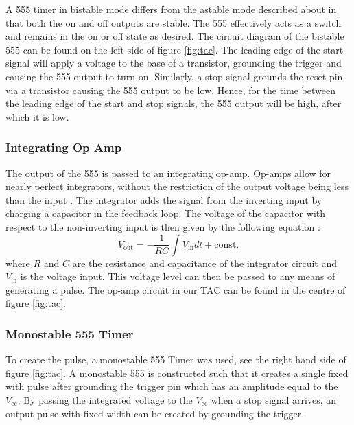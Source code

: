 \documentclass[%
 reprint,
 amsmath,amssymb,
 aps,
]{revtex4-2}
\begin{document}
        A 555 timer in bistable mode differs from the astable mode described about in that both the on and off outputs are stable. The 555 effectively acts as a switch and remains in the on or off state as desired. The circuit diagram of the bistable 555 can be found on the left side of figure \ref{fig:tac}. The leading edge of the start signal will apply a voltage to the base of a transistor, grounding the trigger and causing the 555 output to turn on. Similarly, a stop signal grounds the reset pin via a transistor causing the 555 output to be low. Hence, for the time between the leading edge of the start and stop signals, the 555 output will be high, after which it is low.

        \subsubsection{Integrating Op Amp}
        The output of the 555 is passed to an integrating op-amp. Op-amps allow for nearly perfect integrators, without the restriction of the output voltage being less than the input \cite{horowitz}. The integrator adds the signal from the inverting input by charging a capacitor in the feedback loop. The voltage of the capacitor with respect to the non-inverting input is then given by the following equation \cite{horowitz}:
        \begin{equation}
            V_\text{out} = -\frac{1}{RC} \int V_\text{in} dt + \text{const.}
            \label{eq:integrator}
        \end{equation}where $R$ and $C$ are the resistance and capacitance of the integrator circuit and $V_\text{in}$ is the voltage input. This voltage level can then be passed to any means of generating a pulse. The op-amp circuit in our TAC can be found in the centre of figure \ref{fig:tac}.

        \subsubsection{Monostable 555 Timer}
        To create the pulse, a monostable 555 Timer was used, see the right hand side of figure \ref{fig:tac}. A monostable 555 is constructed such that it creates a single fixed with pulse after grounding the trigger pin which has an amplitude equal to the $V_\text{cc}$. By passing the integrated voltage to the $V_\text{cc}$ when a stop signal arrives, an output pulse with fixed width can be created by grounding the trigger.\\
\end{document}
